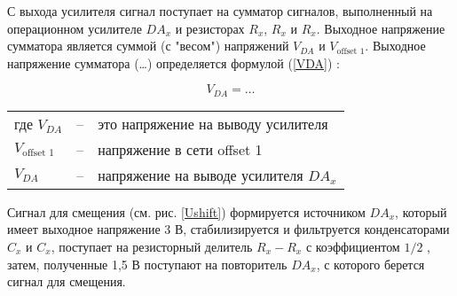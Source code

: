 С выхода усилителя сигнал поступает на сумматор сигналов, выполненный на операционном усилителе $DA_x$ 
и резисторах $R_x$, $R_x$ и $R_x$. Выходное напряжение сумматора является суммой (с "весом") напряжений $V_{DA}$ и 
$V_\text{offset 1}$. 
Выходное напряжение сумматора (\ldots) определяется формулой (\ref{VDA}) :

\begin{equation}
V_{DA} = \ldots
\label{VDA}
\end{equation}


\begin{tabular}{lll}
	где $V_{DA}$ &--& это напряжение на выводу усилителя\\
	$V_\text{offset 1}$ &--& напряжение в сети offset 1\\
	$V_{DA}$ & -- & напряжение на выводе усилителя $DA_x$
\end{tabular}

Сигнал для смещения (см. рис. \ref{Ushift}) формируется источником {$DA_x$}, который имеет выходное напряжение 3 В, 
стабилизируется и фильтруется конденсаторами $C_x$ и $C_x$, поступает на резисторный делитель $R_x-R_x$ с коэффициентом 
$1/2$ , 
затем, полученные 1,5 В поступают на повторитель $DA_x$, с которого берется сигнал для смещения.


